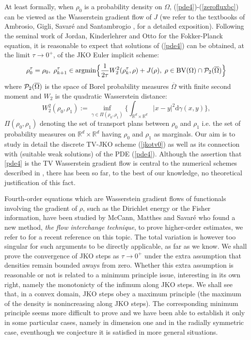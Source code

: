 \documentclass[12pt, a4paper]{article}
\numberwithin{equation}{section}
\theoremstyle{plain}
\theoremstyle{definition}
\theoremstyle{remark}
\newcommand\PP{{\cal P}}
\newcommand{\R}{\mathbb{R}}
\newcommand{\BV}{\mathrm{BV}}
\newcommand{\argmin}{\mathrm{argmin}}
\newcommand{\Omb}{\overline{\Omega}}
\newcommand\pref[1]{(\ref{#1})}
\begin{document}
 At least formally,  when $\rho_0$ is a probability density on $\Omega$, \pref{pde4}-\pref{zerofluxbc} can be viewed as the Wasserstein gradient flow of $J$ (we refer to the textbooks of Ambrosio, Gigli, Savar\'e \cite{ambrosio2008gradient} and Santambrogio \cite{santambrogio2015optimal}, for a detailed exposition). Following the seminal work of Jordan, Kinderlehrer and Otto \cite{jordan1998variational} for the Fokker-Planck equation, it is reasonable to expect that solutions of (\ref{pde4}) can be obtained, at the limit $\tau\to 0^+$, of the JKO Euler implicit scheme:
\begin{equation}\label{jkotv0}
\rho_0^\tau=\rho_0, \; \rho_{k+1}^\tau \in \argmin  \Big\{ \frac{1}{2\tau} W_2^2(\rho_{k}^\tau, \rho)+ J(\rho), \; \rho \in \BV(\Omega)\cap \PP_2(\Omb)\Big\}
\end{equation}
where $\PP_2(\Omb)$ is the space of Borel probability measures $\Omb$ with finite second moment and $W_2$ is the quadratic Wasserstein distance:
\begin{equation}\label{defw2}
W_2^2(\rho_0, \rho_1):=\inf_{\gamma\in \Pi(\rho_0, \rho_1)}  \Big\{ \int_{\R^d\times \R^d} \vert x-y\vert^2 \mbox{d} \gamma(x,y)    \Big\},
\end{equation}
$\Pi(\rho_0, \rho_1)$ denoting the set of transport plans between $\rho_0$ and $\rho_1$ i.e. the set of probability measures on $\R^d\times \R^d$ having $\rho_0$ and $\rho_1$ as marginals. Our aim is to study in detail the discrete TV-JKO scheme \pref{jkotv0} as well as its connection with (suitable weak solutions) of the PDE \pref{pde4}.  Although the assertion  that \eqref{pde4} is the TV Wasserstein gradient flow is central to  the numerical schemes described in \cite{burger2012regularized,during2012high,benning2013primal}, there has been so far, to the best of our knowledge, no theoretical justification of this fact. 

\smallskip

Fourth-order equations which are Wasserstein gradient flows of functionals involving the gradient of $\rho$, such as the Dirichlet energy or the Fisher information, have been studied by McCann, Matthes and Savar\'e \cite{matthes2009fourth} who found a new method, \emph{the flow interchange technique}, to prove higher-order  estimates, we refer to  \cite{Matthes2016} for a recent reference on this topic. The total variation is however too singular for such arguments to be directly applicable, as far as we know. We shall prove the convergence of JKO steps as $\tau \to 0^+$ under the extra assumption that densities remain bounded aways from zero. Whether this  extra assumption is reasonable or not is related to a minimum principle issue, interesting in its own right, namely the monotonicty of the infimum along JKO steps. We shall see that, in a convex domain, JKO steps obey a maximum principle (the maximum of the density is nonincreasing along JKO steps). The corresponding minimum principle seems more difficult to prove and we have been able to establish it only in some particular cases, namely in dimension one and in the radially symmetric case, eventhough we conjecture it is satisfied in more general situations. 
\end{document}
